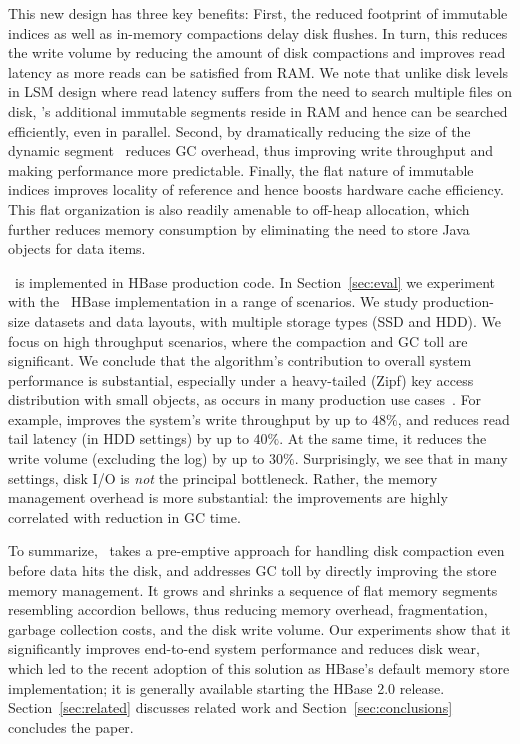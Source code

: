 This new design has three key benefits: 
 First, the reduced footprint of immutable indices as well as in-memory compactions delay disk flushes. In turn, this reduces 
 the write volume by reducing the amount of disk compactions  and improves read latency as more reads can be satisfied from RAM.
We note that unlike disk levels in LSM design where read latency suffers from the need to
search multiple files on disk,  \sys's additional immutable segments reside in RAM and hence can be searched efficiently, even in parallel.
 Second, by dramatically reducing the size of the dynamic segment  \sys\ reduces GC overhead, thus improving write throughput and making performance more predictable.
Finally, the flat nature of immutable indices improves locality of reference and hence boosts hardware cache efficiency. 
This flat organization is also readily amenable to off-heap allocation, which further reduces memory consumption
 by eliminating the need to store Java objects for data items. 

 
\sys\ is implemented in HBase production code. In Section~\ref{sec:eval} we experiment with the \sys\ HBase implementation in a range of scenarios.
We study production-size datasets and data layouts, with multiple storage types (SSD and HDD). 
We focus on high throughput scenarios, where the compaction and GC toll are significant. 
We conclude that the algorithm's contribution to overall system performance is substantial, 
especially under a  heavy-tailed (Zipf) key access distribution with 
small objects, as occurs in many production use cases~\cite{Wu2015}. For example, \sys\/ 
improves the system's write throughput by up to $48\%$, and reduces read tail latency 
(in HDD settings)  
by up to $40\%$. At the same time, it reduces the write volume (excluding the log) by up to $30\%$. Surprisingly, we see 
that in many settings, disk I/O is \emph{not} the principal bottleneck. Rather, the memory management 
overhead is more substantial: the improvements are highly correlated with  reduction in GC time. 

To summarize, \sys\ takes a pre-emptive approach for handling disk compaction even before data hits the disk, and addresses GC toll by directly improving the store memory management.
It grows and shrinks a sequence of flat memory segments resembling accordion bellows, 
thus reducing memory overhead, fragmentation, garbage collection costs, and the disk write volume. 
Our experiments show that it significantly improves end-to-end system performance and reduces disk wear, 
which led to the recent adoption of this solution as HBase's default memory store implementation; it is generally available starting the HBase 2.0 release.
 Section~\ref{sec:related} discusses related work 
and Section~\ref{sec:conclusions} concludes the paper.

